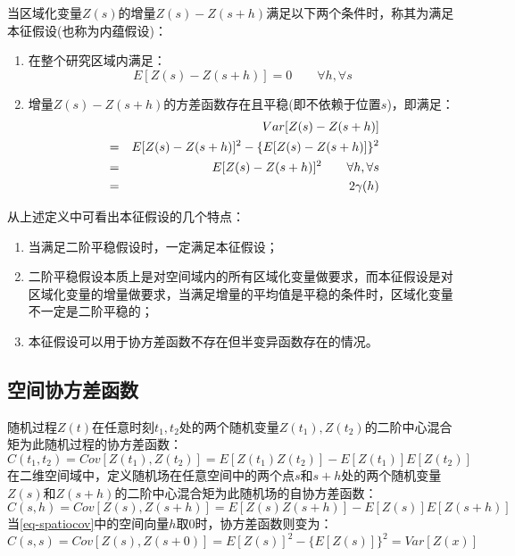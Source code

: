 当区域化变量$Z(s)$的增量$Z(s)-Z(s+h)$满足以下两个条件时，称其为满足本征假设(也称为内蕴假设)：
\begin{enumerate}
    \item 在整个研究区域内满足：
        \begin{equation}
            E[Z(s)-Z(s+h)] = 0 \qquad \forall h, \forall s
            \label{eq-intrinsiccondition1}
        \end{equation}
    \item 增量$Z(s)-Z(s+h)$的方差函数存在且平稳(即不依赖于位置$s$)，即满足：
        \begin{eqnarray}
            && Var[Z(s)-Z(s+h)] \notag \\
            &=& E[Z(s)-Z(s+h)]^2 - \{ E[Z(s)-Z(s+h)] \}^2 \notag \\
            &=& E[Z(s)-Z(s+h)]^2 \qquad \forall h, \forall s \\
            &=& 2 \gamma (h) \notag
            \label{eq-intrinsiccondition2}
        \end{eqnarray}
\end{enumerate}

从上述定义中可看出本征假设的几个特点：
\begin{enumerate}
    \item 当满足二阶平稳假设时，一定满足本征假设；
    \item 二阶平稳假设本质上是\textcolor[rgb]{1,0,0}{对空间域内的所有区域化变量做要求，而本征假设是对区域化变量的增量做要求}，当满足增量的平均值是平稳的条件时，区域化变量不一定是二阶平稳的；
    \item 本征假设可以用于\textcolor[rgb]{1,0,0}{协方差函数不存在但半变异函数存在的情况}。
\end{enumerate}



\subsection{空间协方差函数}
随机过程$Z(t)$在任意时刻$t_1,t_2$处的两个随机变量$Z(t_1),Z(t_2)$的二阶中心混合矩为此随机过程的协方差函数：
\begin{equation}
    C(t_1,t_2) = Cov\left[ Z(t_1),Z(t_2) \right] = E\left[ Z(t_1)Z(t_2) \right] - E\left[ Z(t_1) \right] E\left[ Z(t_2) \right]
    \label{eq-temporalcov}
\end{equation}
在二维空间域中，定义随机场在任意空间中的两个点$s$和$s+h$处的两个随机变量$Z(s)$和$Z(s+h)$的二阶中心混合矩为此随机场的自协方差函数：
\begin{equation}
    C(s,h) = Cov\left[ Z(s),Z(s+h) \right] = E\left[ Z(s)Z(s+h) \right]-E\left[ Z(s) \right] E\left[ Z(s+h) \right]
    \label{eq-spatiocov}
\end{equation}
当\cref{eq-spatiocov}中的空间向量$h$取0时，协方差函数则变为：
\begin{equation}
    C(s,s) = Cov\left[ Z(s), Z(s+0) \right] = E\left[ Z(s) \right]^2 - \{ E\left[ Z(s) \right] \}^2 = Var\left[ Z(x) \right]
    \label{eq-spatiocovsimplize}
\end{equation}

